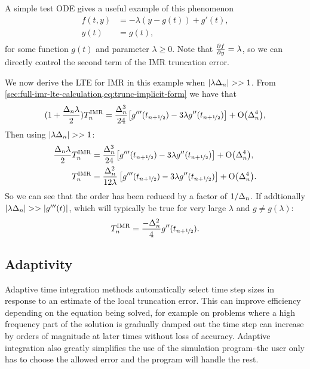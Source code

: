 A simple test ODE gives a useful example of this phenomenon \cite[157]{Atkinson2009}
\begin{equation}
  \label{eqn:imr-test-order-reduction}
  \begin{aligned}
    f(t, y) &= -\lambda (y - g(t)) + g'(t), \\
    y(t) &= g(t), \\
  \end{aligned}
\end{equation}
for some function $g(t)$ and parameter $\lambda \geq 0$.
Note that $\frac{\partial f}{\partial y} = \lambda$, so we can directly control the second term of the IMR truncation error.

We now derive the LTE for IMR in this example when $\left|{\lambda\Delta_{n}} \right| >> 1$.
From \cref{sec:full-imr-lte-calculation,eq:trunc-implicit-form} we have that
\begin{equation}
  \begin{aligned}
    (1 + \frac{\Delta_{n} \lambda}{2})T_n^{\text{IMR}} &= \frac{\Delta_{n}^3}{24}
    {\left[ g'''(t_{n+\nicefrac{1}{2}}) - 3 \lambda g''(t_{n+\nicefrac{1}{2}}) \right]} + \text{O}{\left( \Delta_{n}^4 \right)}, \\ 
  \end{aligned}
\end{equation}
Then using $\left|{\lambda\Delta_{n}} \right| >> 1$:
\begin{equation}
  \begin{aligned}
    \frac{\Delta_{n} \lambda}{2} T_n^{\text{IMR}} &= \frac{\Delta_{n}^3}{24}
    {\left[ g'''(t_{n+\nicefrac{1}{2}}) - 3 \lambda g''(t_{n+\nicefrac{1}{2}}) \right]} + \text{O}{\left( \Delta_{n}^4 \right)}, \\ 
    T_n^{\text{IMR}} &= \frac{\Delta_{n}^2}{12\lambda} \left[g'''(t_{n+\nicefrac{1}{2}}) - 3 \lambda g''(t_{n+\nicefrac{1}{2}}) \right] + \text{O}{\left( \Delta_{n}^4 \right)}.
  \end{aligned}
\end{equation}
So we can see that the order has been reduced by a factor of $1/\Delta_{n}$.
If addtionally $\left|{\lambda\Delta_{n}} \right| >> \left|{g'''(t)} \right|$, which will typically be true for very large $\lambda$ and $g \neq g(\lambda)$:
\begin{equation}
  T_n^{\text{IMR}} = \frac{-\Delta_{n}^2}{4} g''(t_{n+\nicefrac{1}{2}}).
  \label{eq:reduced-order-imr-truncation-error}
\end{equation}


\subsection{Adaptivity}
\label{sec:adaptivity}

Adaptive time integration methods automatically select time step sizes in response to an estimate of the local truncation error.
This can improve efficiency depending on the equation being solved, for example on problems where a high frequency part of the solution is gradually damped out the time step can increase by orders of magnitude at later times without loss of accuracy.
Adaptive integration also greatly simplifies the use of the simulation program--the user only has to choose the allowed error and the program will handle the rest.

